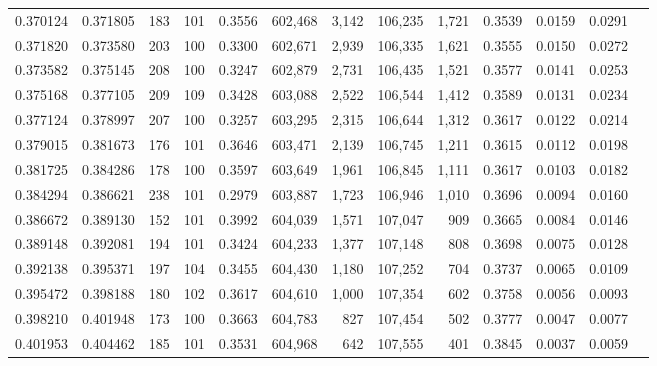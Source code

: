 \begin{tabular}{rrrrrrrrrrrrr}
0.370124 & 0.371805 &   183 & 101 &                                     0.3556 & 602,468 &   3,142 & 106,235 &   1,721 & 0.3539 & 0.0159 & 0.0291 \\
0.371820 & 0.373580 &   203 & 100 &                                     0.3300 & 602,671 &   2,939 & 106,335 &   1,621 & 0.3555 & 0.0150 & 0.0272 \\
0.373582 & 0.375145 &   208 & 100 &                                     0.3247 & 602,879 &   2,731 & 106,435 &   1,521 & 0.3577 & 0.0141 & 0.0253 \\
0.375168 & 0.377105 &   209 & 109 &                                     0.3428 & 603,088 &   2,522 & 106,544 &   1,412 & 0.3589 & 0.0131 & 0.0234 \\
0.377124 & 0.378997 &   207 & 100 &                                     0.3257 & 603,295 &   2,315 & 106,644 &   1,312 & 0.3617 & 0.0122 & 0.0214 \\
0.379015 & 0.381673 &   176 & 101 &                                     0.3646 & 603,471 &   2,139 & 106,745 &   1,211 & 0.3615 & 0.0112 & 0.0198 \\
0.381725 & 0.384286 &   178 & 100 &                                     0.3597 & 603,649 &   1,961 & 106,845 &   1,111 & 0.3617 & 0.0103 & 0.0182 \\
0.384294 & 0.386621 &   238 & 101 &                                     0.2979 & 603,887 &   1,723 & 106,946 &   1,010 & 0.3696 & 0.0094 & 0.0160 \\
0.386672 & 0.389130 &   152 & 101 &                                     0.3992 & 604,039 &   1,571 & 107,047 &     909 & 0.3665 & 0.0084 & 0.0146 \\
0.389148 & 0.392081 &   194 & 101 &                                     0.3424 & 604,233 &   1,377 & 107,148 &     808 & 0.3698 & 0.0075 & 0.0128 \\
0.392138 & 0.395371 &   197 & 104 &                                     0.3455 & 604,430 &   1,180 & 107,252 &     704 & 0.3737 & 0.0065 & 0.0109 \\
0.395472 & 0.398188 &   180 & 102 &                                     0.3617 & 604,610 &   1,000 & 107,354 &     602 & 0.3758 & 0.0056 & 0.0093 \\
0.398210 & 0.401948 &   173 & 100 &                                     0.3663 & 604,783 &     827 & 107,454 &     502 & 0.3777 & 0.0047 & 0.0077 \\
0.401953 & 0.404462 &   185 & 101 &                                     0.3531 & 604,968 &     642 & 107,555 &     401 & 0.3845 & 0.0037 & 0.0059 \\

\end{tabular}
